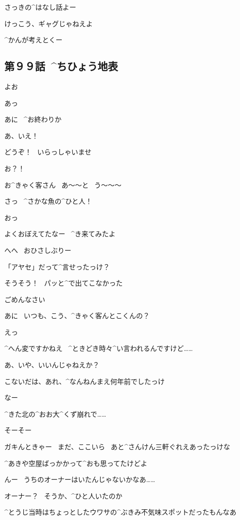 \Ayase さっきの^{はなし}{話}よー

\Ayase けっこう、ギャグじゃねえよ

\Makki ^{かんが}{考}えとくー


\subsection{第９９話\ ^{ちひょう}{地表}}

\page[156]
\Ayase よお

\Alpha あっ

\Ayase あに
\ ^{お}{終}わりか

\Alpha あ、いえ！

\Alpha どうぞ！
\ いらっしゃいませ

\page
\Alpha お？！

\Alpha お^{きゃく}{客}さん
\ あ〜〜と
\ う〜〜〜

\Alpha さっ
\ ^{さかな}{魚}の^{ひと}{人}！

\Ayase おっ

\Ayase よくおぼえてたなー
\ ^{き}{来}てみたよ

\Alpha へへ
\ おひさしぶりー

\Ayase 「アヤセ」だって^{言}{せ}ったっけ？

\Alpha そうそう！
\ パッと^{で}{出}てこなかった

\Alpha ごめんなさい

\page
\Ayase あに
\ いつも、こう、^{きゃく}{客}んとこくんの？

\Alpha えっ

\Alpha ^{へん}{変}ですかねえ
\ ^{ときどき}{時々}^{い}{言}われるんですけど……

\Ayase あ、いや、いいんじゃねえか？

\page
\Alpha こないだは、あれ、^{なんねんまえ}{何年前}でしたっけ

\Ayase なー

\Ayase ^{きた}{北}の^{おお}{大}^{くず}{崩}れで……

\Alpha そーそー

\page
\Ayase ガキんときゃー
\ まだ、ここいら
\ あと^{さんけん}{三軒}ぐれえあったっけな

\Ayase ^{あきや}{空屋}ばっかかって^{おも}{思}ってたけどよ

\Alpha んー
\ うちのオーナーはいたんじゃないかなあ……

\Ayase オーナー？
\ そうか、^{ひと}{人}いたのか

\page
\Ayase ^{とうじ}{当時}はちょっとしたウワサの^{ぶきみ}{不気味}スポットだったもんなあ

